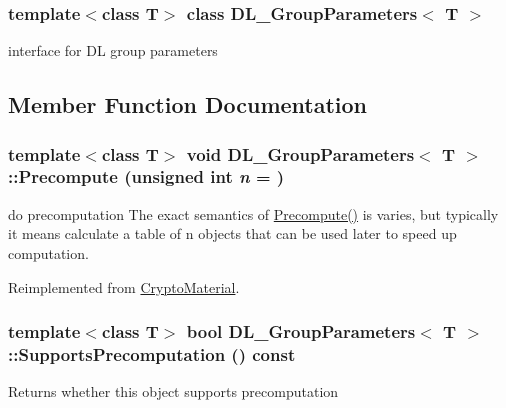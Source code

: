 \subsubsection*{template$<$class T$>$ class DL\_\-GroupParameters$<$ T $>$}

interface for DL group parameters 

\subsection{Member Function Documentation}
\hypertarget{class_d_l___group_parameters_a5f04ae8b4d0b9410a046af1607fbbb6f}{
\subsubsection[{Precompute}]{\setlength{\rightskip}{0pt plus 5cm}template$<$class T$>$ void {\bf DL\_\-GroupParameters}$<$ T $>$::Precompute (unsigned int {\em n} = {})}}
\label{class_d_l___group_parameters_a5f04ae8b4d0b9410a046af1607fbbb6f}


do precomputation The exact semantics of \hyperlink{class_d_l___group_parameters_a5f04ae8b4d0b9410a046af1607fbbb6f}{Precompute()} is varies, but typically it means calculate a table of n objects that can be used later to speed up computation. 

Reimplemented from \hyperlink{class_crypto_material_a39e512d2ea70d0e967db98c19994a7fd}{CryptoMaterial}.\hypertarget{class_d_l___group_parameters_a42a423fd9d31e77a1d36e7da66da12bb}{
\subsubsection[{SupportsPrecomputation}]{\setlength{\rightskip}{0pt plus 5cm}template$<$class T$>$ bool {\bf DL\_\-GroupParameters}$<$ T $>$::SupportsPrecomputation () const}}
\label{class_d_l___group_parameters_a42a423fd9d31e77a1d36e7da66da12bb}
\begin{DoxyReturn}{Returns}
whether this object supports precomputation 
\end{DoxyReturn}


